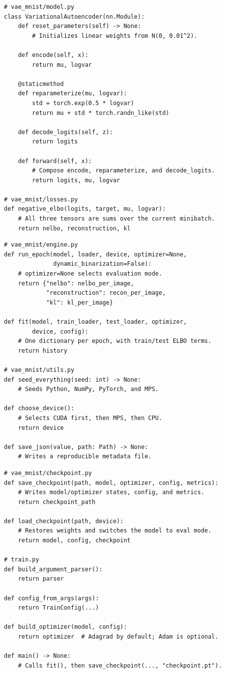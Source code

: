 \documentclass[11pt]{article}
\begin{document}
\begin{lstlisting}[style=pythonstyle,caption={Model and objective interfaces.}]
# vae_mnist/model.py
class VariationalAutoencoder(nn.Module):
    def reset_parameters(self) -> None:
        # Initializes linear weights from N(0, 0.01^2).

    def encode(self, x):
        return mu, logvar

    @staticmethod
    def reparameterize(mu, logvar):
        std = torch.exp(0.5 * logvar)
        return mu + std * torch.randn_like(std)

    def decode_logits(self, z):
        return logits

    def forward(self, x):
        # Compose encode, reparameterize, and decode_logits.
        return logits, mu, logvar

# vae_mnist/losses.py
def negative_elbo(logits, target, mu, logvar):
    # All three tensors are sums over the current minibatch.
    return nelbo, reconstruction, kl
\end{lstlisting}

\begin{lstlisting}[style=pythonstyle,caption={Optimization, utility, and entry-point interfaces.}]
# vae_mnist/engine.py
def run_epoch(model, loader, device, optimizer=None,
              dynamic_binarization=False):
    # optimizer=None selects evaluation mode.
    return {"nelbo": nelbo_per_image,
            "reconstruction": recon_per_image,
            "kl": kl_per_image}

def fit(model, train_loader, test_loader, optimizer,
        device, config):
    # One dictionary per epoch, with train/test ELBO terms.
    return history

# vae_mnist/utils.py
def seed_everything(seed: int) -> None:
    # Seeds Python, NumPy, PyTorch, and MPS.

def choose_device():
    # Selects CUDA first, then MPS, then CPU.
    return device

def save_json(value, path: Path) -> None:
    # Writes a reproducible metadata file.
\end{lstlisting}

\begin{lstlisting}[style=pythonstyle,caption={Checkpoint and training entry-point interfaces.}]
# vae_mnist/checkpoint.py
def save_checkpoint(path, model, optimizer, config, metrics):
    # Writes model/optimizer states, config, and metrics.
    return checkpoint_path

def load_checkpoint(path, device):
    # Restores weights and switches the model to eval mode.
    return model, config, checkpoint

# train.py
def build_argument_parser():
    return parser

def config_from_args(args):
    return TrainConfig(...)

def build_optimizer(model, config):
    return optimizer  # Adagrad by default; Adam is optional.

def main() -> None:
    # Calls fit(), then save_checkpoint(..., "checkpoint.pt").
\end{lstlisting}
\end{document}
